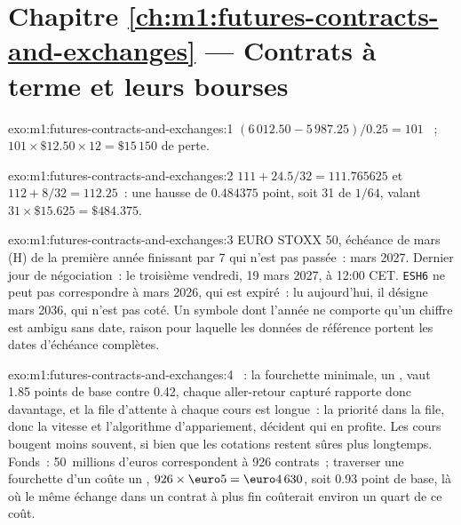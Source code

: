 \section*{Chapitre \ref{ch:m1:futures-contracts-and-exchanges} --- Contrats à terme et leurs bourses}

\begin{solution}{exo:m1:futures-contracts-and-exchanges:1}
$(6\,012.50 - 5\,987.25)/0.25 = 101$ ~; $101 \times \$12.50 \times 12 =
\$15\,150$ de perte.
\end{solution}

\begin{solution}{exo:m1:futures-contracts-and-exchanges:2}
$111 + 24.5/32 = 111.765625$ et $112 + 8/32 = 112.25$~: une hausse de $0.484375$
point, soit 31  de $1/64$, valant $31 \times \$15.625 = \$484.375$.
\end{solution}

\begin{solution}{exo:m1:futures-contracts-and-exchanges:3}
 EURO STOXX 50, échéance de mars (H) de la première année finissant par 7 qui n'est pas
passée~: mars 2027. Dernier jour de négociation~: le troisième vendredi, 19 mars 2027, à 12:00
CET. \texttt{ESH6} ne peut pas correspondre à mars 2026, qui est expiré~: lu aujourd'hui, il
désigne mars 2036, qui n'est pas coté. Un symbole dont l'année ne comporte qu'un chiffre est
ambigu sans date, raison pour laquelle les données de référence portent
les dates d'échéance complètes.
\end{solution}

\begin{solution}{exo:m1:futures-contracts-and-exchanges:4}
~: la fourchette minimale, un , vaut 1.85 points de base contre
0.42, chaque aller-retour capturé rapporte donc davantage, et la file d'attente à chaque cours est
longue~: la priorité dans la file, donc la vitesse et l'algorithme d'appariement,
décident qui en profite. Les cours bougent moins souvent, si bien que les cotations restent sûres plus longtemps. Fonds~:
50~millions d'euros correspondent à 926 contrats~; traverser une fourchette d'un  coûte un
, $926 \times \text{\euro}5 = \text{\euro}4\,630$, soit 0.93 point de base, là où le
même échange dans un contrat à  plus fin coûterait environ un quart de
ce coût.
\end{solution}

